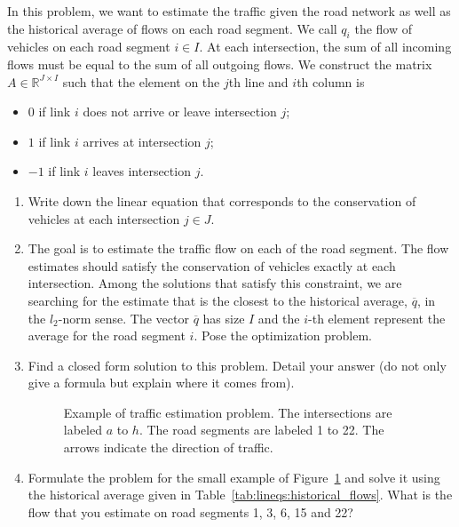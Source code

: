 \documentclass[11pt]{article}
\begin{document}
In this problem, we want to estimate the traffic given the road network as well as the historical average of flows on each road segment. We call $q_i$ the flow of vehicles on each road segment $i\in I$. At each intersection, the sum of all incoming flows must be equal to the sum of all outgoing flows. We construct the matrix $A \in \mathbb{R}^{J\times I}$ such that the element on the $j$th line and $i$th column is
\begin{itemize}
\item $0$ if link $i$ does not arrive or leave intersection $j$;
\item $1$ if link $i$ arrives at intersection $j$;
\item $-1$ if link $i$ leaves intersection $j$.
\end{itemize}

\begin{enumerate}
\item Write down the linear equation that corresponds to the conservation of vehicles at each intersection $j\in J$.

\item The goal is to estimate the traffic flow on each of the road segment. The flow estimates should satisfy the conservation of vehicles exactly at each intersection. Among the solutions that satisfy this constraint, we are searching for the estimate that is the closest to the historical average, $\overline{q}$, in the $l_2$-norm sense. The vector $\overline{q}$ has size $I$ and the $i$-th element represent the average for the road segment $i$. Pose the optimization problem.

\item Find a closed form solution to this problem. Detail your answer (do not only give a formula but explain where it comes from).

\begin{figure}[!ht]
\centering
\caption{Example of traffic estimation problem. The intersections are labeled $a$ to $h$. The road segments are labeled 1 to 22. The arrows indicate the direction of traffic.}
\label{fig:flows}
\end{figure}
\item Formulate the problem for the small example of Figure~\ref{fig:flows} and solve it using the historical average given in Table~\ref{tab:lineqs:historical_flows}. What is the flow that you estimate on road segments 1, 3, 6, 15 and 22?


\end{enumerate}
\end{document}
